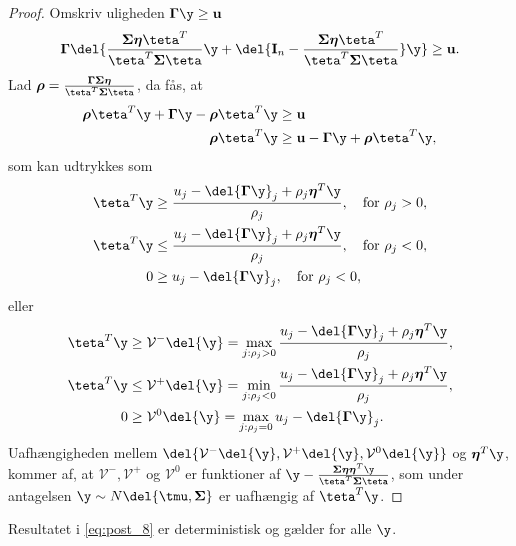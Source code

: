 \begin{proof}
Omskriv uligheden \(\boldsymbol{\Gamma} \y \geq \mathbf{u}\)
\begin{align*}
\boldsymbol{\Gamma} \del{ \frac{\boldsymbol{\Sigma} \boldsymbol{\eta} \teta^T}{\teta^T \boldsymbol{\Sigma} \teta} \y + \del{\mathbf{I}_n - \frac{\boldsymbol{\Sigma}\boldsymbol{\eta} \teta^T}{\teta^T \boldsymbol{\Sigma} \teta}} \y} \geq \mathbf{u}.
\end{align*}
Lad \(\boldsymbol{\rho} = \frac{\boldsymbol{\Gamma} \boldsymbol{\Sigma} \boldsymbol{\eta}}{\teta^T \boldsymbol{\Sigma} \teta}\), da fås, at
\begin{align*}
\boldsymbol{\rho} \teta^T \y + \boldsymbol{\Gamma} \y - \boldsymbol{\rho} \teta^T \y &\geq \mathbf{u} \\
\boldsymbol{\rho} \teta^T \y &\geq \mathbf{u} - \boldsymbol{\Gamma} \y + \boldsymbol{\rho} \teta^T \y,
\end{align*}
som kan udtrykkes som
\begin{align*}
\teta^T \y & \geq \frac{u_j - \del{\boldsymbol{\Gamma} \y}_j + \rho_j \boldsymbol{\eta}^T \y}{\rho_j}, \quad \text{for } \rho_j > 0, \\
\teta^T \y & \leq \frac{u_j - \del{\boldsymbol{\Gamma} \y}_j + \rho_j \boldsymbol{\eta}^T \y}{\rho_j}, \quad \text{for } \rho_j < 0, \\
0 &\geq u_j - \del{\boldsymbol{\Gamma} \y}_j, \quad \text{for } \rho_j < 0,
\end{align*}
eller
\begin{align*}
\teta^T \y & \geq \mathcal{V}^- \del{\y} = \max_{j: \rho_j > 0} \frac{u_j - \del{\boldsymbol{\Gamma} \y}_j + \rho_j \boldsymbol{\eta}^T \y}{\rho_j},\\
\teta^T \y & \leq \mathcal{V}^+ \del{\y} = \min_{j: \rho_j < 0} \frac{u_j - \del{\boldsymbol{\Gamma} \y}_j + \rho_j \boldsymbol{\eta}^T \y}{\rho_j}, \\
0 &\geq \mathcal{V}^0 \del{\y} = \max_{j: \rho_j = 0} u_j - \del{\boldsymbol{\Gamma} \y}_j.
\end{align*}
Uafhængigheden mellem \(\del{\mathcal{V}^-\del{\y}, \mathcal{V}^+\del{\y},\mathcal{V}^0\del{\y}}\) og \(\boldsymbol{\eta}^T \y\), kommer af, at \(\mathcal{V}^-, \mathcal{V}^+\) og \(\mathcal{V}^0\) er funktioner af \(\y - \frac{ \boldsymbol{\Sigma} \boldsymbol{\eta} \boldsymbol{\eta}^T \y}{\teta^T \boldsymbol{\Sigma} \teta} \), som under antagelsen \(\y \sim N \del{\tmu,  \boldsymbol{\Sigma}}\) er uafhængig af \(\teta^T \y\).
\end{proof}
%
Resultatet i \eqref{eq:post_8} er deterministisk og gælder for alle \(\y\).

